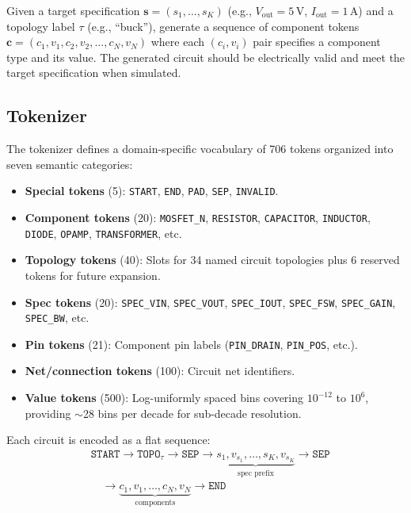 \documentclass[conference]{IEEEtran}
\begin{document}
Given a target specification $\mathbf{s} = (s_1, \ldots, s_K)$ (e.g.,
$V_\text{out}=5$\,V, $I_\text{out}=1$\,A) and a topology label $\tau$
(e.g., ``buck''), generate a sequence of component tokens
$\mathbf{c} = (c_1, v_1, c_2, v_2, \ldots, c_N, v_N)$ where each
$(c_i, v_i)$ pair specifies a component type and its value. The
generated circuit should be electrically valid and meet the target
specification when simulated.

\subsection{Tokenizer}

The tokenizer defines a domain-specific vocabulary of 706 tokens organized into
seven semantic categories:
\begin{itemize}
    \item \textbf{Special tokens} (5): \texttt{START}, \texttt{END},
    \texttt{PAD}, \texttt{SEP}, \texttt{INVALID}.
    \item \textbf{Component tokens} (20): \texttt{MOSFET\_N},
    \texttt{RESISTOR}, \texttt{CAPACITOR}, \texttt{INDUCTOR},
    \texttt{DIODE}, \texttt{OPAMP}, \texttt{TRANSFORMER}, etc.
    \item \textbf{Topology tokens} (40): Slots for 34 named circuit
    topologies plus 6 reserved tokens for future expansion.
    \item \textbf{Spec tokens} (20): \texttt{SPEC\_VIN},
    \texttt{SPEC\_VOUT}, \texttt{SPEC\_IOUT}, \texttt{SPEC\_FSW},
    \texttt{SPEC\_GAIN}, \texttt{SPEC\_BW}, etc.
    \item \textbf{Pin tokens} (21): Component pin labels
    (\texttt{PIN\_DRAIN}, \texttt{PIN\_POS}, etc.).
    \item \textbf{Net/connection tokens} (100): Circuit net identifiers.
    \item \textbf{Value tokens} (500): Log-uniformly spaced bins covering
    $10^{-12}$ to $10^{6}$, providing $\sim$28 bins per decade for
    sub-decade resolution.
\end{itemize}

Each circuit is encoded as a flat sequence:
\[
\begin{aligned}
&\texttt{START} \!\to\! \texttt{TOPO}_\tau \!\to\! \texttt{SEP} \!\to\!
\underbrace{s_1, v_{s_1}, \ldots, s_K, v_{s_K}}_{\text{spec prefix}} \!\to\! \texttt{SEP} \\
&\quad\to\! \underbrace{c_1, v_1, \ldots, c_N, v_N}_{\text{components}} \!\to\! \texttt{END}
\end{aligned}
\]
\end{document}
